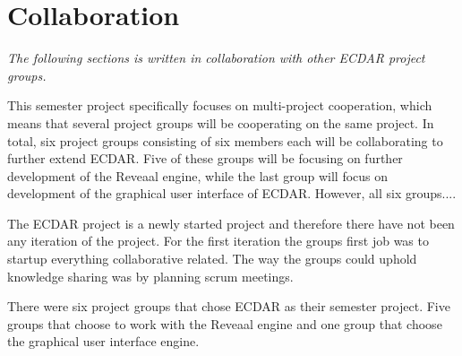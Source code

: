 \section{Collaboration}\label{sec:cooperation}
\textit{The following sections is written in collaboration with other ECDAR project groups.}


This semester project specifically focuses on multi-project cooperation, which means that several project groups will be cooperating on the same project. In total, six project groups consisting of six members each will be collaborating to further extend ECDAR. Five of these groups will be focusing on further development of the Reveaal engine, while the last group will focus on development of the graphical user interface of ECDAR. However, all six groups....


The ECDAR project is a newly started project and therefore there have not been any iteration of the project.
For the first iteration the groups first job was to startup everything collaborative related. 
The way the groups could uphold knowledge sharing was by planning scrum meetings.

There were six project groups that chose ECDAR as their semester project. 
Five groups that choose to work with the Reveaal engine and one group that choose the graphical user interface engine.



